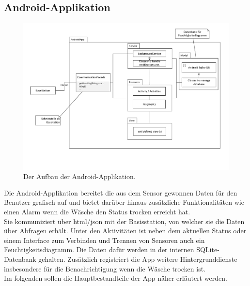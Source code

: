 \subsection{Android-Applikation}
\begin{figure}[htb] 
	\centerline{\includegraphics[scale=.6]{Architektur/App_v2.pdf} }
	\caption{Der Aufbau der Android-Applikation.}
\end{figure}
Die Android-Applikation bereitet die aus dem Sensor gewonnen Daten für den Benutzer grafisch auf und bietet darüber hinaus zusätzliche Funktionalitäten wie einen Alarm wenn die Wäsche den Status \glqq{}trocken\grqq{} erreicht hat.\\
Sie kommuniziert über html/json mit der Basisstation, von welcher sie die Daten über Abfragen erhält. Unter den Aktivitäten ist neben dem aktuellen Status oder einem Interface zum Verbinden und Trennen von Sensoren auch ein Feuchtigkeitsdiagramm. Die Daten dafür werden in der internen SQLite-Datenbank gehalten. Zusätzlich registriert die App weitere Hintergrunddienste insbesondere für die Benachrichtigung wenn die Wäsche trocken ist.\\
Im folgenden sollen die Hauptbestandteile der App näher erläutert werden.

